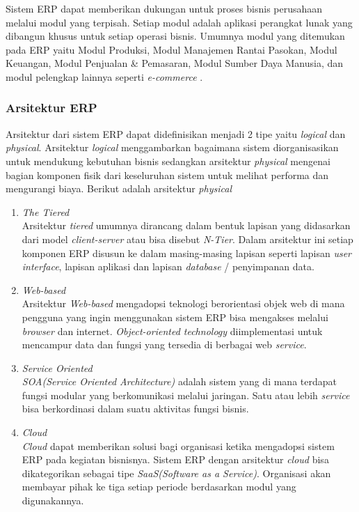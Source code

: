 Sistem ERP dapat memberikan dukungan untuk proses bisnis perusahaan melalui modul yang terpisah. Setiap modul adalah aplikasi perangkat lunak yang dibangun khusus untuk setiap operasi bisnis. Umumnya modul yang ditemukan pada ERP yaitu Modul Produksi, Modul Manajemen Rantai Pasokan, Modul Keuangan, Modul Penjualan \& Pemasaran, Modul Sumber Daya Manusia, dan modul pelengkap lainnya seperti \textit{e-commerce} \cite{D94}.

\subsubsection{Arsitektur ERP}
Arsitektur dari sistem ERP dapat didefinisikan menjadi 2 tipe yaitu \textit{logical} dan \textit{physical}. Arsitektur \textit{logical} menggambarkan bagaimana sistem diorganisasikan untuk mendukung kebutuhan bisnis sedangkan arsitektur \textit{physical} mengenai bagian komponen fisik dari keseluruhan sistem untuk melihat performa dan mengurangi biaya. Berikut adalah arsitektur \textit{physical} \cite{D94} 
\begin{enumerate}[leftmargin=1.3cm]
	\item \textit{The Tiered}\\
	Arsitektur \textit{tiered} umumnya dirancang dalam bentuk lapisan yang didasarkan dari model \textit{client-server} atau bisa disebut \textit{N-Tier}. Dalam arsitektur ini setiap komponen ERP disusun ke dalam masing-masing lapisan seperti lapisan \textit{user interface}, lapisan aplikasi dan lapisan \textit{database} / penyimpanan data.
	\item \textit{Web-based}\\
	Arsitektur \textit{Web-based} mengadopsi teknologi berorientasi objek web di mana pengguna yang ingin menggunakan sistem ERP bisa mengakses melalui \textit{browser} dan internet. \textit{Object-oriented technology} diimplementasi untuk mencampur data dan fungsi yang tersedia di berbagai web \textit{service}.
	\item \textit{Service Oriented}\\
	\textit{SOA(Service Oriented Architecture)} adalah sistem yang di mana terdapat fungsi  modular yang berkomunikasi melalui jaringan. Satu atau lebih \textit{service} bisa berkordinasi dalam suatu aktivitas fungsi bisnis. 
	\item \textit{Cloud}\\
	\textit{Cloud} dapat memberikan solusi bagi organisasi ketika mengadopsi sistem ERP pada kegiatan bisnisnya. Sistem ERP dengan arsitektur \textit{cloud} bisa dikategorikan sebagai tipe \textit{SaaS(Software as a Service)}. Organisasi akan membayar pihak ke tiga setiap periode berdasarkan modul yang digunakannya.\\ 
\end{enumerate}

